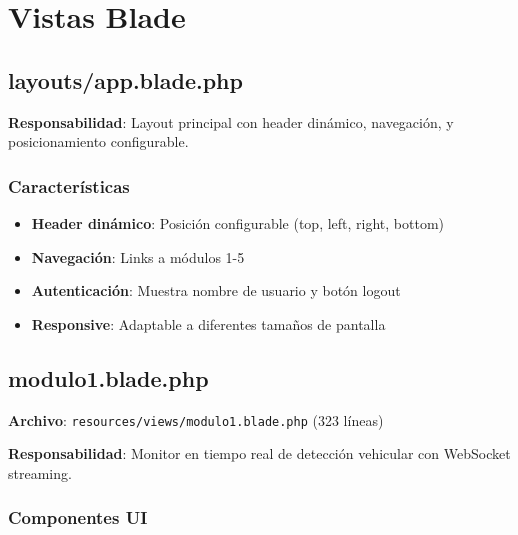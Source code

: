 \documentclass[12pt,a4paper]{article}
\begin{document}
\newpage

\section{Vistas Blade}

\subsection{layouts/app.blade.php}

\textbf{Responsabilidad}: Layout principal con header dinámico, navegación, y posicionamiento configurable.

\subsubsection{Características}

\begin{itemize}
    \item \textbf{Header dinámico}: Posición configurable (top, left, right, bottom)
    \item \textbf{Navegación}: Links a módulos 1-5
    \item \textbf{Autenticación}: Muestra nombre de usuario y botón logout
    \item \textbf{Responsive}: Adaptable a diferentes tamaños de pantalla
\end{itemize}

\subsection{modulo1.blade.php}

\textbf{Archivo}: \texttt{resources/views/modulo1.blade.php} (323 líneas)

\textbf{Responsabilidad}: Monitor en tiempo real de detección vehicular con WebSocket streaming.

\subsubsection{Componentes UI}
\end{document}
